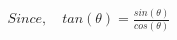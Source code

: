 \documentclass[preview]{standalone}
\begin{document}
\begin{align*}
Since, \quad tan(\theta)=\frac{sin(\theta)}{cos(\theta)}
\end{align*}
\end{document}
